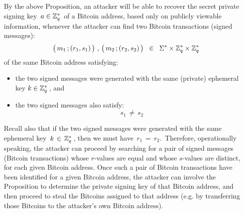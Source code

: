\begin{remark}
\mbox{}
\vskip 0.1cm
\noindent
By the above Proposition, an attacker will be able to recover the secret
private signing key \,$a \in \mathbb{Z}_{q}^{*}$\, of a Bitcoin address, based only on
publicly viewable information, whenever the attacker can find two
Bitcoin transactions (signed messages):
\begin{equation*}
\left(\,m_{1}\,\overset{{\color{white}.}}{;}\,(r_{1},s_{1})\,\right)
\,,\,
\left(\,m_{2}\,\overset{{\color{white}.}}{;}\,(r_{2},s_{2})\,\right)
\;\; \in \;\;
	\Sigma^{*} \times \Z_{q}^{*} \times \Z_{q}^{*}
\end{equation*}
of the same Bitcoin address satisfying:
\begin{itemize}
\item
	the two signed messages were generated
	with the same (private) ephemeral key $k \in \mathbb{Z}_{q}^{*}$\,,
	and
\item
	the two signed messages also satisfy:
	\begin{equation*}
	s_{1} \,\neq\, s_{2}
	\end{equation*}
\end{itemize}
Recall also that if the two signed messages were generated with the
same ephemeral key \,$k \,\in\, \mathbb{Z}_{q}^{*}$\,, then we must have
\,$r_{1} \,=\, r_{2}$.\,
Therefore, operationally speaking, the attacker can proceed by
searching for a pair of signed messages (Bitcoin transactions)
whose $r$-values are equal and whose $s$-values are distinct,
for each given Bitcoin address.
Once such a pair of Bitcoin transactions have been identified
for a given Bitcoin address, the attacker can involve the
Proposition to determine the private signing key of that Bitcoin
address, and then proceed to steal the Bitcoins assigned to
that address (e.g. by transferring those Bitcoins to the attacker's
own Bitcoin address).
\end{remark}

